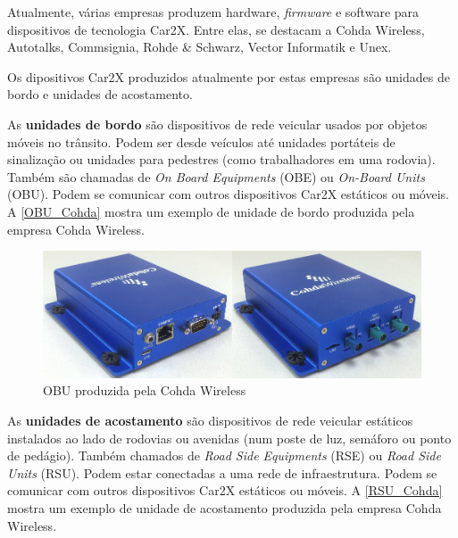 \documentclass[
12pt,				%
openright,			%
oneside,			%
a4paper,			%
brazil,				%
]{abntex2}
\begin{document}
	\par Atualmente, várias empresas produzem hardware, \textit{firmware} e software para dispositivos de tecnologia Car2X. Entre elas, se destacam a Cohda Wireless, Autotalks, Commsignia, Rohde \& Schwarz, Vector Informatik e Unex.
	
	Os dipositivos Car2X produzidos atualmente por estas empresas são unidades de bordo e unidades de acostamento.
	
	\par As \textbf{unidades de bordo} são dispositivos de rede veicular usados por objetos móveis no trânsito. Podem ser desde veículos até unidades portáteis de sinalização ou unidades para pedestres (como trabalhadores em uma rodovia). Também são chamadas de \textit{On Board Equipments} (OBE) ou \textit{On-Board Units} (OBU). Podem se comunicar com outros dispositivos Car2X estáticos ou móveis. A \autoref{OBU_Cohda} mostra um exemplo de unidade de bordo produzida pela empresa Cohda Wireless.
	
	\begin{figure} [H]
		\centering
		\includegraphics[scale=.45]{figuras/waveDevices/CohdaOBU}
		\caption{\label{OBU_Cohda}OBU produzida pela Cohda Wireless}
	\end{figure}	
	
	\par As \textbf{unidades de acostamento} são dispositivos de rede veicular estáticos instalados ao lado de rodovias ou avenidas (num poste de luz, semáforo ou ponto de pedágio). Também chamados de \textit{Road Side Equipments} (RSE) ou \textit{Road Side Units} (RSU). Podem estar conectadas a uma rede de infraestrutura. Podem se comunicar com outros dispositivos Car2X estáticos ou móveis. A \autoref{RSU_Cohda} mostra um exemplo de unidade de acostamento produzida pela empresa Cohda Wireless.
	
\end{document}

